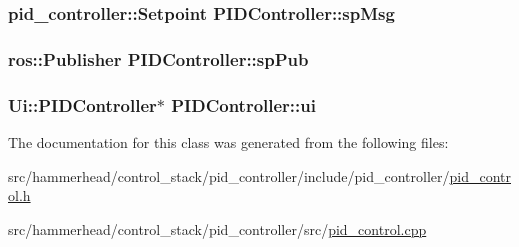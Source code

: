 \subsubsection[{\texorpdfstring{sp\+Msg}{spMsg}}]{\setlength{\rightskip}{0pt plus 5cm}pid\+\_\+controller\+::\+Setpoint P\+I\+D\+Controller\+::sp\+Msg\hspace{0.3cm}{\ttfamily [private]}}\hypertarget{classPIDController_ac855862250d6358a44640f65245d8d6e}{}\label{classPIDController_ac855862250d6358a44640f65245d8d6e}
\subsubsection[{\texorpdfstring{sp\+Pub}{spPub}}]{\setlength{\rightskip}{0pt plus 5cm}ros\+::\+Publisher P\+I\+D\+Controller\+::sp\+Pub\hspace{0.3cm}{\ttfamily [private]}}\hypertarget{classPIDController_aeb778d197e52ca65c1a593deddec0e78}{}\label{classPIDController_aeb778d197e52ca65c1a593deddec0e78}
\subsubsection[{\texorpdfstring{ui}{ui}}]{\setlength{\rightskip}{0pt plus 5cm}Ui\+::\+P\+I\+D\+Controller$\ast$ P\+I\+D\+Controller\+::ui\hspace{0.3cm}{\ttfamily [private]}}\hypertarget{classPIDController_a7e321e72a5082ba2c08b5ab05bea4009}{}\label{classPIDController_a7e321e72a5082ba2c08b5ab05bea4009}


The documentation for this class was generated from the following files\+:\begin{DoxyCompactItemize}
\item 
src/hammerhead/control\+\_\+stack/pid\+\_\+controller/include/pid\+\_\+controller/\hyperlink{pid__control_8h}{pid\+\_\+control.\+h}\item 
src/hammerhead/control\+\_\+stack/pid\+\_\+controller/src/\hyperlink{pid__control_8cpp}{pid\+\_\+control.\+cpp}\end{DoxyCompactItemize}
